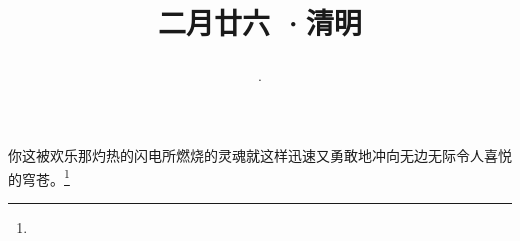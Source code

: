 \title{\date[d=4,m=4,y=2024][year:cn-y,年,month:cn,day:cn,日,·,weekday]·二月廿六 ·清明}
你这被欢乐那灼热的闪电所燃烧的灵魂就这样迅速又勇敢地冲向无边无际令人喜悦的穹苍。\footnote{ }

